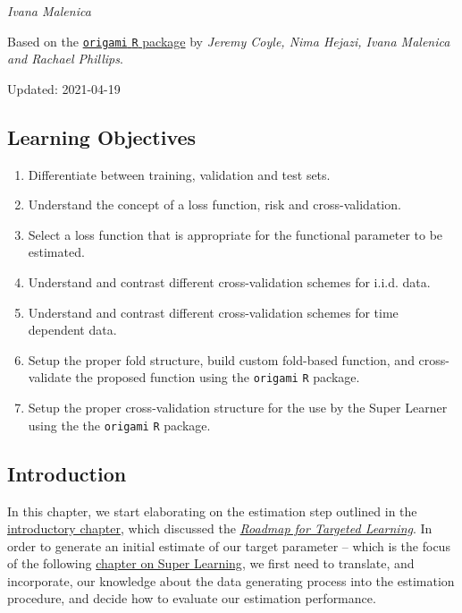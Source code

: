 \documentclass[12pt, krantz2,]{krantz}
\providecommand{\tightlist}{%
  \setlength{\itemsep}{0pt}\setlength{\parskip}{0pt}}
\theoremstyle{definition}
\theoremstyle{definition}
\theoremstyle{definition}
\newcommand{\1}{\mathbbm{1}}
\begin{document}
\emph{Ivana Malenica}

Based on the \href{https://github.com/tlverse/origami}{\texttt{origami} \texttt{R} package}
by \emph{Jeremy Coyle, Nima Hejazi, Ivana Malenica and Rachael Phillips}.

Updated: 2021-04-19

\hypertarget{learning-objectives-2}{%
\subsection{Learning Objectives}\label{learning-objectives-2}}

\begin{enumerate}
\def\labelenumi{\arabic{enumi}.}
\tightlist
\item
  Differentiate between training, validation and test sets.
\item
  Understand the concept of a loss function, risk and cross-validation.
\item
  Select a loss function that is appropriate for the functional parameter to be
  estimated.
\item
  Understand and contrast different cross-validation schemes for i.i.d. data.
\item
  Understand and contrast different cross-validation schemes for time dependent
  data.
\item
  Setup the proper fold structure, build custom fold-based function, and
  cross-validate the proposed function using the \texttt{origami} \texttt{R} package.
\item
  Setup the proper cross-validation structure for the use by the Super Learner
  using the the \texttt{origami} \texttt{R} package.
\end{enumerate}

\hypertarget{introduction-1}{%
\subsection{Introduction}\label{introduction-1}}

In this chapter, we start elaborating on the estimation step outlined in the
\protect\hyperlink{intro}{introductory chapter}, which discussed the \protect\hyperlink{roadmap}{\emph{Roadmap for Targeted
Learning}}. In order to generate an initial estimate of our target
parameter -- which is the focus of the following \protect\hyperlink{sl3}{chapter on Super
Learning}, we first need to translate, and incorporate, our knowledge
about the data generating process into the estimation procedure, and decide how
to evaluate our estimation performance.
\end{document}
